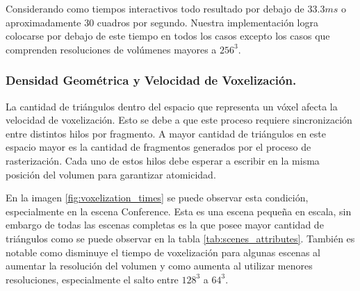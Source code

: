 Considerando como tiempos interactivos todo resultado por debajo de $33.3 ms$ o aproximadamente 30 cuadros por segundo. Nuestra implementación logra colocarse por debajo de este tiempo en todos los casos excepto los casos que comprenden resoluciones de volúmenes mayores a $256^3$.

\subsubsection{Densidad Geométrica y Velocidad de Voxelización.}
La cantidad de triángulos dentro del espacio que representa un vóxel afecta la velocidad de voxelización. Esto se debe a que este proceso requiere sincronización entre distintos hilos por fragmento. A mayor cantidad de triángulos en este espacio mayor es la cantidad de fragmentos generados por el proceso de rasterización. Cada uno de estos hilos debe esperar a escribir en la misma posición del volumen para garantizar atomicidad.

En la imagen \ref{fig:voxelization_times} se puede observar esta condición, especialmente en la escena Conference. Esta es una escena pequeña en escala, sin embargo de todas las escenas completas es la que posee mayor cantidad de triángulos como se puede observar en la tabla \ref{tab:scenes_attributes}. También es notable como disminuye el tiempo de voxelización para algunas escenas al aumentar la resolución del volumen y como aumenta al utilizar menores resoluciones, especialmente el salto entre $128^3$ a $64^3$.


